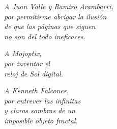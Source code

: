 \thispagestyle{empty}

  \vspace*{.15\paperheight}
  
  \begin{flushright}
    
    \emph{A Juan Valle y Ramiro Arambarri,\\
         por permitirme abrigar la ilusión\\
         de que las páginas que siguen\\
         no son del todo ineficaces.}

       \vspace*{2em}
       
       \emph{A Mojoptix,\\
         por inventar el\\
         reloj de Sol digital.}

       \vspace*{2em}

       \emph{A Kenneth Falconer,\\
         por entrever las infinitas\\
         y claras sombras de un\\
       imposible objeto fractal.}

       
  \end{flushright}

  
  



